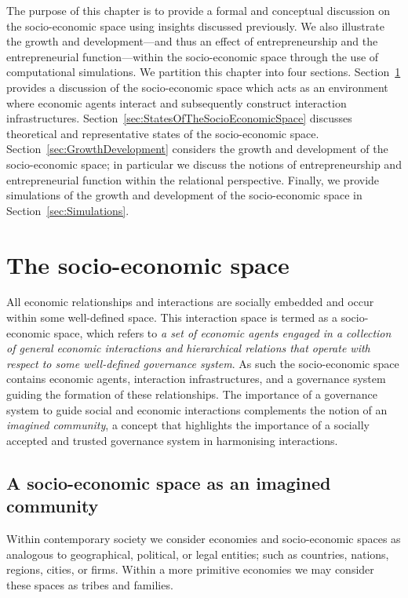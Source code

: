 The purpose of this chapter is to provide a formal and conceptual discussion on the socio-economic space using insights discussed previously. We also illustrate the growth and development---and thus an effect of entrepreneurship and the entrepreneurial function---within the socio-economic space through the use of computational simulations. We partition this chapter into four sections. Section~\ref{sec:socio-economicspace} provides a discussion of the socio-economic space which acts as an environment where economic agents interact and subsequently construct interaction infrastructures. Section~\ref{sec:StatesOfTheSocioEconomicSpace} discusses theoretical and representative states of the socio-economic space. Section~\ref{sec:GrowthDevelopment} considers the growth and development of the socio-economic space; in particular we discuss the notions of entrepreneurship and entrepreneurial function within the relational perspective. Finally, we provide simulations of the growth and development of the socio-economic space in Section~\ref{sec:Simulations}.

\section{The socio-economic space} 
\label{sec:socio-economicspace}

All economic relationships and interactions are socially embedded and occur within some well-defined space. This interaction space is termed as a socio-economic space, which refers to \emph{a set of economic agents engaged in a collection of general economic interactions and hierarchical relations that operate with respect to some well-defined governance system}. As such the socio-economic space contains economic agents, interaction infrastructures, and a governance system guiding the formation of these relationships. The importance of a governance system to guide social and economic interactions complements the notion of an \emph{imagined community}, a concept that highlights the importance of a socially accepted and trusted governance system in harmonising interactions.

\subsection{A socio-economic space as an imagined community}

Within contemporary society we consider economies and socio-economic spaces as analogous to geographical, political, or legal entities; such as countries, nations, regions, cities, or firms. Within a more primitive economies we may consider these spaces as tribes and families.

